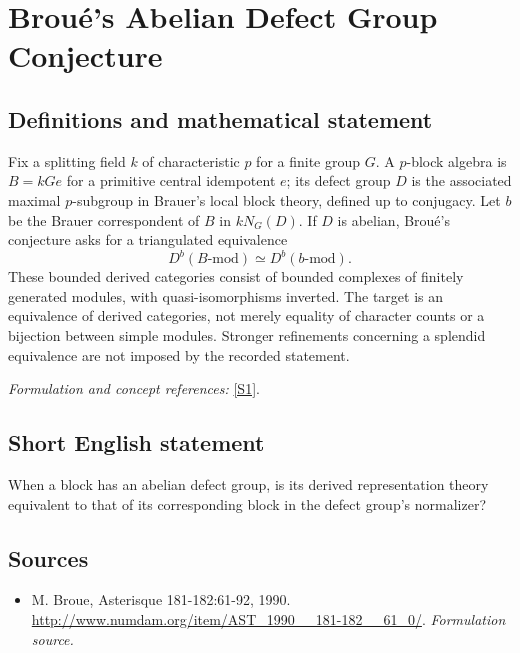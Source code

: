 \documentclass[11pt]{article}
\begin{document}
\section*{\texorpdfstring{Broué's Abelian Defect Group Conjecture}{Broué's Abelian Defect Group Conjecture}}\label{30002013}
\subsection{Definitions and mathematical statement}
Fix a splitting field $k$ of characteristic $p$ for a finite group $G$. A $p$-block algebra is $B=kGe$ for a primitive central idempotent $e$; its defect group $D$ is the associated maximal $p$-subgroup in Brauer's local block theory, defined up to conjugacy. Let $b$ be the Brauer correspondent of $B$ in $kN_G(D)$. If $D$ is abelian, Brou\'e's conjecture asks for a triangulated equivalence
\[
 D^b(B\text{-}\mathrm{mod})\simeq D^b(b\text{-}\mathrm{mod}).
\]
These bounded derived categories consist of bounded complexes of finitely generated modules, with quasi-isomorphisms inverted. The target is an equivalence of derived categories, not merely equality of character counts or a bijection between simple modules. Stronger refinements concerning a splendid equivalence are not imposed by the recorded statement.
\par\smallskip\textit{Formulation and concept references:} \href{http://www.numdam.org/item/AST_1990__181-182__61_0/}{[S1]}.

\subsection{Short English statement}
When a block has an abelian defect group, is its derived representation theory equivalent to that of its corresponding block in the defect group's normalizer?
\subsection{Sources}
\begin{itemize}
\item[S1]M. Broue, Asterisque 181-182:61-92, 1990.
\url{http://www.numdam.org/item/AST_1990__181-182__61_0/}.
\textit{Formulation source.}
\end{itemize}
\end{document}
